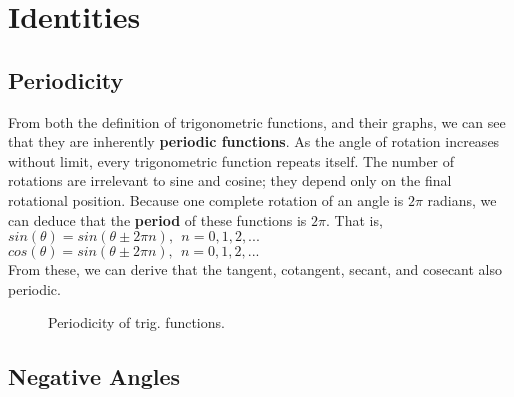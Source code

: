 \section{Identities}

\subsection{Periodicity}
From both the definition of trigonometric functions, and their graphs, we can see that they are inherently {\bf periodic functions}.  As the angle of rotation increases without limit, every trigonometric function repeats itself.  The number of rotations are irrelevant to sine and cosine;  they depend only on the final rotational position.  Because one complete rotation of an angle is $2\pi$ radians, we can deduce that the {\bf period} of these functions is $2\pi$.  That is,\\

\tab$sin(\theta) = sin(\theta \pm 2\pi n), \ \ n=0,1,2,...$\\

\tab$cos(\theta) = sin(\theta \pm 2\pi n), \ \ n=0,1,2,...$\\

From these, we can derive that the tangent, cotangent, secant, and cosecant also periodic.

\begin{figure}[htb]
\center
\caption{Periodicity of trig. functions.}
\label{fig:preiodicity of trig. functions}
\end{figure}


\subsection{Negative Angles}

